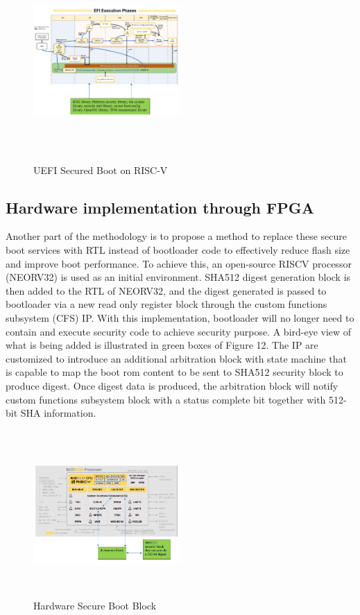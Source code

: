 \documentclass[a4paper,fleqn]{cas-dc}
\begin{document}
\begin{figure}[hbt!]
	\centering
	\includegraphics[width=0.5\textwidth,height=3in]{figs/SecureBootOnRISCV.JPG}
	\caption{UEFI Secured Boot on RISC-V}
\end{figure}

\subsection{ Hardware implementation through FPGA}
Another part of the methodology is to propose a method to replace these secure boot services with RTL instead of bootloader code to effectively reduce flash size and improve boot performance. To achieve this, an open-source RISCV processor (NEORV32) is used as an initial environment. SHA512 digest generation block is then added to the RTL of NEORV32, and the digest generated is passed to bootloader via a new read only register block through the custom functions subsystem (CFS) IP. With this implementation, bootloader will no longer need to contain and execute security code to achieve security purpose. A bird-eye view of what is being added is illustrated in green boxes of Figure 12. The IP are customized to introduce an additional arbitration block with state machine that is capable to map the boot rom content to be sent to SHA512 security block to produce digest. Once digest data is produced, the arbitration block will notify custom functions subsystem block with a status complete bit together with 512-bit SHA information. 

\begin{figure}[hbt!]
	\centering
	\includegraphics[width=0.5\textwidth,height=2.5in]{figs/HardwareSecureBootBlock.JPG}
	\caption{Hardware Secure Boot Block}
\end{figure}
\end{document}
